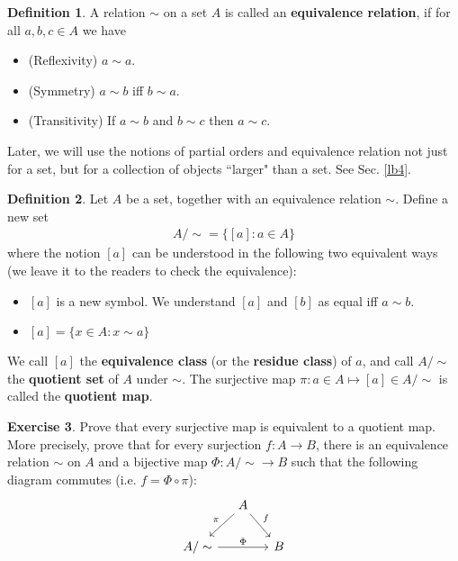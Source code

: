 \documentclass[12pt,b5paper,notitlepage]{article}
\theoremstyle{definition}
\newtheorem{df}{Definition}[section]
\newtheorem{exe}[df]{Exercise}
\theoremstyle{plain}
\numberwithin{equation}{section}
\begin{document}
\begin{df}\label{lb156}
A relation $\sim$ on a set $A$ is called an \textbf{equivalence relation},  if for all $a,b,c\in A$ we have
\begin{itemize}
\item (Reflexivity) $a\sim a$.
\item (Symmetry) $a\sim b$ iff $b\sim a$.
\item (Transitivity) If $a\sim b$ and $b\sim c$ then $a\sim c$.
\end{itemize}
\end{df}

Later, we will use the notions of partial orders and equivalence relation not just for a set, but for a collection of objects ``larger" than a set. See Sec. \ref{lb4}.

\begin{df}\label{lb157}
Let $A$ be a set, together with an equivalence relation $\sim$. Define a new set
\begin{align*}
{A/\sim}=\{[a]: a\in A\}
\end{align*}
where the notion $[a]$ can be understood in the following two equivalent ways (we leave it to the readers to check the equivalence):
\begin{itemize}
\item[(1)] $[a]$ is a new symbol. We understand $[a]$ and $[b]$ as equal iff $a\sim b$.
\item[(2)] $[a]=\{x\in A: x\sim a \}$
\end{itemize}
We call $[a]$ the \textbf{equivalence class} (or the \textbf{residue class}) of $a$, and call $A/\sim$ the \textbf{quotient set}  of $A$ under $\sim$. The surjective map $\pi:a\in A\mapsto [a]\in {A/\sim}$ is called the \textbf{quotient map}.
\end{df}


\begin{exe}
Prove that every surjective map  is equivalent to a quotient map. More precisely, prove that for every surjection $f:A\rightarrow B$, there is an equivalence relation $\sim$ on $A$ and a bijective map $\Phi:{A/\sim}\rightarrow B$ such that the following diagram commutes (i.e. $f=\Phi\circ\pi$):
\begin{equation}\label{eq7}
\begin{tikzcd}[column sep=small]
                          & A \arrow[rd, "f"] \arrow[ld, "\pi"'] &   \\
{A/\sim} \arrow[rr, "\Phi"] &                                      & B
\end{tikzcd}
\end{equation}
\end{exe}
\end{document}
